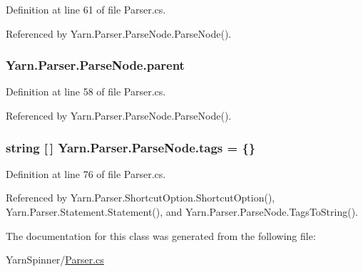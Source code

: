 Definition at line 61 of file Parser.\-cs.



Referenced by Yarn.\-Parser.\-Parse\-Node.\-Parse\-Node().

\hypertarget{a00138_af313a82103fcc2ff5a177dbb06b92f7b}{
\subsubsection[{parent}]{ Yarn.\-Parser.\-Parse\-Node.\-parent\hspace{0.3cm}{\ttfamily [package]}}}\label{a00138_af313a82103fcc2ff5a177dbb06b92f7b}


Definition at line 58 of file Parser.\-cs.



Referenced by Yarn.\-Parser.\-Parse\-Node.\-Parse\-Node().

\hypertarget{a00138_a58b3a15788fd2d4127d73619dc6d04ae}{
\subsubsection[{tags}]{\setlength{\rightskip}{0pt plus 5cm}string \mbox{[}$\,$\mbox{]} Yarn.\-Parser.\-Parse\-Node.\-tags = \{\}\hspace{0.3cm}{\ttfamily [package]}}}\label{a00138_a58b3a15788fd2d4127d73619dc6d04ae}


Definition at line 76 of file Parser.\-cs.



Referenced by Yarn.\-Parser.\-Shortcut\-Option.\-Shortcut\-Option(), Yarn.\-Parser.\-Statement.\-Statement(), and Yarn.\-Parser.\-Parse\-Node.\-Tags\-To\-String().



The documentation for this class was generated from the following file\-:\begin{DoxyCompactItemize}
\item 
Yarn\-Spinner/\hyperlink{a00295}{Parser.\-cs}\end{DoxyCompactItemize}
